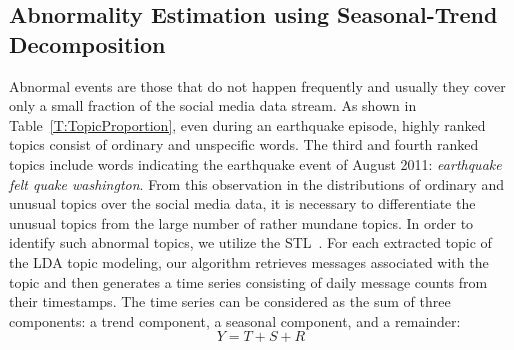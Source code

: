 \subsection{Abnormality Estimation using Seasonal-Trend Decomposition}
\label{subsec:filtering}
Abnormal events are those that do not happen frequently and usually they cover only a small fraction of the social media data stream.
As shown in Table~\ref{T:TopicProportion}, even during an earthquake episode, highly ranked topics consist of ordinary and unspecific words.
The third and fourth ranked topics include words indicating the earthquake event of August 2011:
\textit{earthquake felt quake washington}.
From this observation in the distributions of ordinary and unusual topics over the social media data,
it is necessary to differentiate the unusual topics from the large number of rather mundane topics.
In order to identify such abnormal topics, %
we utilize the STL~\cite{Cleveland:1990:SAS}.
For each extracted topic of the LDA topic modeling, our algorithm retrieves messages associated with the topic and then generates a time series consisting of daily message counts from their timestamps.
%
The time series can be considered as the sum of three components: a trend component, a seasonal 
component, and a remainder:
%
\begin{equation}
Y = T + S + R
\end{equation}
